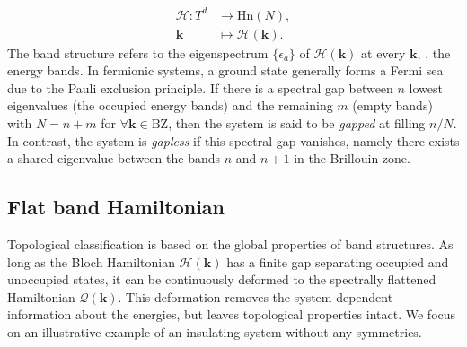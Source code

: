 \begin{equation}
\begin{aligned}
\mathcal{H}: T^d & \rightarrow \mathrm{Hn} (N), \\
\mathbf{k} & \mapsto \mathcal{H} (\mathbf{k}).
\end{aligned}
\end{equation}
The band structure refers to the eigenspectrum $\lbrace \epsilon_a \rbrace$ of $\mathcal{H} (\mathbf{k})$ at every $\mathbf{k}$, \ie, the energy bands. In fermionic systems, a ground state generally forms a Fermi sea due to the Pauli exclusion principle. If there is a spectral gap between $n$ lowest eigenvalues (the occupied energy bands) and the remaining $m$ (empty bands) with $N = n + m$  for $\forall \mathbf{k} \in \mathrm{BZ}$, then the system is said to be \emph{gapped} at filling $n/N$. In contrast, the system is \emph{gapless} if this spectral gap vanishes, namely there exists a shared eigenvalue between the bands $n$ and $n + 1$ in the Brillouin zone.

\subsection{Flat band Hamiltonian}
\label{sec:flatband}
Topological classification is based on the global properties of band structures. As long as the Bloch Hamiltonian $\mathcal{H} (\mathbf{k})$ has a finite gap separating occupied and unoccupied states, it can be continuously deformed to the spectrally flattened Hamiltonian $\mathcal{Q} (\mathbf{k})$. This deformation removes the system-dependent information about the energies, but leaves topological properties intact. We focus on an illustrative example of an insulating system without any symmetries.


